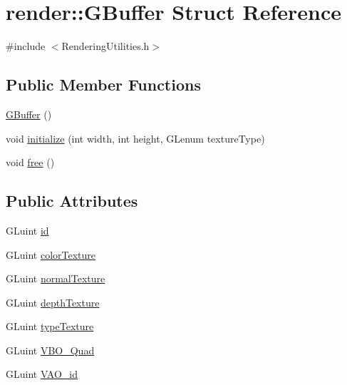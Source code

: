 \hypertarget{structrender_1_1_g_buffer}{}\section{render\+:\+:G\+Buffer Struct Reference}
\label{structrender_1_1_g_buffer}


{\ttfamily \#include $<$Rendering\+Utilities.\+h$>$}

\subsection*{Public Member Functions}
\begin{DoxyCompactItemize}
\item 
\hyperlink{structrender_1_1_g_buffer_aa3903c42076a72fa12a6b895c71ba8ef}{G\+Buffer} ()
\item 
void \hyperlink{structrender_1_1_g_buffer_a78c7037b06e32fccf68aed9f0aff2d46}{initialize} (int width, int height, G\+Lenum texture\+Type)
\item 
void \hyperlink{structrender_1_1_g_buffer_a73362688a4d979386579630c4bad210d}{free} ()
\end{DoxyCompactItemize}
\subsection*{Public Attributes}
\begin{DoxyCompactItemize}
\item 
G\+Luint \hyperlink{structrender_1_1_g_buffer_a5cf059b7a1b488cb83aac14af5400cfd}{id}
\item 
G\+Luint \hyperlink{structrender_1_1_g_buffer_a2360d86e84c85abfd2d651f2efdb6ee0}{color\+Texture}
\item 
G\+Luint \hyperlink{structrender_1_1_g_buffer_aceb674941af99581958a0b83d50f8552}{normal\+Texture}
\item 
G\+Luint \hyperlink{structrender_1_1_g_buffer_afd3864821db2982a6f74731693b978dd}{depth\+Texture}
\item 
G\+Luint \hyperlink{structrender_1_1_g_buffer_a52dce2b24bb04fe0e900f3e580018520}{type\+Texture}
\item 
G\+Luint \hyperlink{structrender_1_1_g_buffer_a6c38cbbcbe0e88af725d91a6eb54567d}{V\+B\+O\+\_\+\+Quad}
\item 
G\+Luint \hyperlink{structrender_1_1_g_buffer_ad88a76d003bb3001a135ab7e90e3ed1e}{V\+A\+O\+\_\+id}
\end{DoxyCompactItemize}



